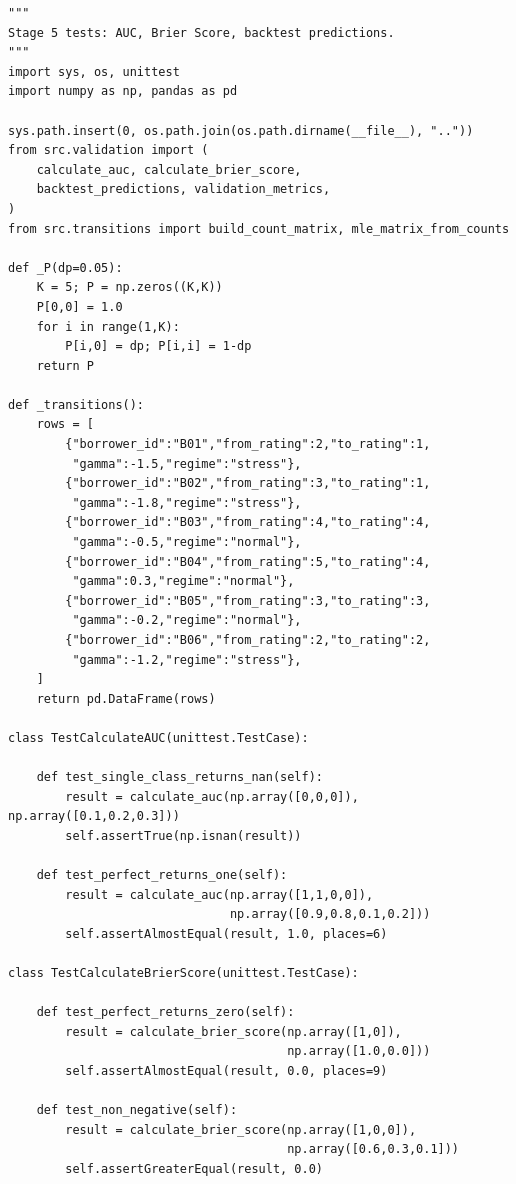 \documentclass[12pt,a4paper]{article}
\begin{document}
\begin{lstlisting}[caption={test\_validation.py --- Stage 5: Backtesting Metrics}]
"""
Stage 5 tests: AUC, Brier Score, backtest predictions.
"""
import sys, os, unittest
import numpy as np, pandas as pd

sys.path.insert(0, os.path.join(os.path.dirname(__file__), ".."))
from src.validation import (
    calculate_auc, calculate_brier_score,
    backtest_predictions, validation_metrics,
)
from src.transitions import build_count_matrix, mle_matrix_from_counts

def _P(dp=0.05):
    K = 5; P = np.zeros((K,K))
    P[0,0] = 1.0
    for i in range(1,K):
        P[i,0] = dp; P[i,i] = 1-dp
    return P

def _transitions():
    rows = [
        {"borrower_id":"B01","from_rating":2,"to_rating":1,
         "gamma":-1.5,"regime":"stress"},
        {"borrower_id":"B02","from_rating":3,"to_rating":1,
         "gamma":-1.8,"regime":"stress"},
        {"borrower_id":"B03","from_rating":4,"to_rating":4,
         "gamma":-0.5,"regime":"normal"},
        {"borrower_id":"B04","from_rating":5,"to_rating":4,
         "gamma":0.3,"regime":"normal"},
        {"borrower_id":"B05","from_rating":3,"to_rating":3,
         "gamma":-0.2,"regime":"normal"},
        {"borrower_id":"B06","from_rating":2,"to_rating":2,
         "gamma":-1.2,"regime":"stress"},
    ]
    return pd.DataFrame(rows)

class TestCalculateAUC(unittest.TestCase):

    def test_single_class_returns_nan(self):
        result = calculate_auc(np.array([0,0,0]), np.array([0.1,0.2,0.3]))
        self.assertTrue(np.isnan(result))

    def test_perfect_returns_one(self):
        result = calculate_auc(np.array([1,1,0,0]),
                               np.array([0.9,0.8,0.1,0.2]))
        self.assertAlmostEqual(result, 1.0, places=6)

class TestCalculateBrierScore(unittest.TestCase):

    def test_perfect_returns_zero(self):
        result = calculate_brier_score(np.array([1,0]),
                                       np.array([1.0,0.0]))
        self.assertAlmostEqual(result, 0.0, places=9)

    def test_non_negative(self):
        result = calculate_brier_score(np.array([1,0,0]),
                                       np.array([0.6,0.3,0.1]))
        self.assertGreaterEqual(result, 0.0)


\end{lstlisting}
\end{document}
